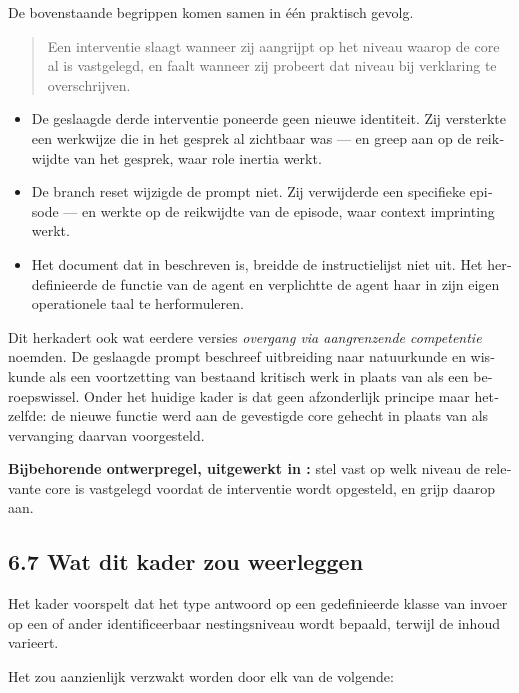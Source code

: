 \begin{dutch}
De bovenstaande begrippen komen samen in één praktisch gevolg.

\begin{quote}
Een interventie slaagt wanneer zij aangrijpt op het niveau waarop de core al is vastgelegd, en faalt wanneer zij probeert dat niveau bij verklaring te overschrijven.
\end{quote}
\begin{itemize}
  \item De geslaagde derde interventie poneerde geen nieuwe identiteit. Zij versterkte een werkwijze die in het gesprek al zichtbaar was — en greep aan op de reikwijdte van het gesprek, waar role inertia werkt.
  \item De branch reset wijzigde de prompt niet. Zij verwijderde een specifieke episode — en werkte op de reikwijdte van de episode, waar context imprinting werkt.
  \item Het document dat in  beschreven is, breidde de instructielijst niet uit. Het herdefinieerde de functie van de agent en verplichtte de agent haar in zijn eigen operationele taal te herformuleren.
\end{itemize}
Dit herkadert ook wat eerdere versies \emph{overgang via aangrenzende competentie} noemden. De geslaagde prompt beschreef uitbreiding naar natuurkunde en wiskunde als een voortzetting van bestaand kritisch werk in plaats van als een beroepswissel. Onder het huidige kader is dat geen afzonderlijk principe maar hetzelfde: de nieuwe functie werd aan de gevestigde core gehecht in plaats van als vervanging daarvan voorgesteld.

\textbf{Bijbehorende ontwerpregel, uitgewerkt in :} stel vast op welk niveau de relevante core is vastgelegd voordat de interventie wordt opgesteld, en grijp daarop aan.


\subsection*{6.7 Wat dit kader zou weerleggen}
\label{sec:nl:6.7}

Het kader voorspelt dat het type antwoord op een gedefinieerde klasse van invoer op een of ander identificeerbaar nestingsniveau wordt bepaald, terwijl de inhoud varieert.

Het zou aanzienlijk verzwakt worden door elk van de volgende:


\end{dutch}
